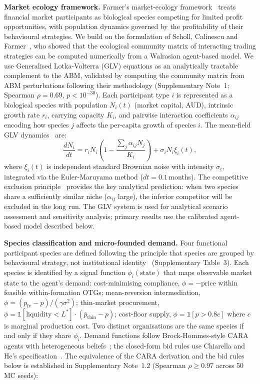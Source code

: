 \documentclass[pdflatex,sn-nature,oneside]{sn-jnl}
\begin{document}
\textbf{Market ecology framework.}
Farmer's market-ecology framework~\cite{Farmer2002} treats financial market
participants as biological species competing for limited profit opportunities,
with population dynamics governed by the profitability of their behavioural
strategies. We build on the formulation of Scholl, Calinescu and
Farmer~\cite{SchollCalinescuFarmer2021}, who showed that the ecological
community matrix of interacting trading strategies can be computed numerically
from a Walrasian agent-based model.
We use Generalised Lotka-Volterra (GLV) equations as an analytically tractable
complement to the ABM, validated by computing the community matrix from ABM
perturbations following their methodology (Supplementary Note~1;
Spearman $\rho = 0.69$, $p < 10^{-30}$).
Each participant type $i$ is represented as a biological species with population
$N_i(t)$ (market capital, AUD), intrinsic growth rate $r_i$, carrying capacity $K_i$,
and pairwise interaction coefficients $\alpha_{ij}$ encoding how species $j$ affects
the per-capita growth of species $i$.
The mean-field GLV dynamics~\cite{Volterra1926} are:
\begin{equation}
  \frac{dN_i}{dt} = r_i N_i \left(1 - \frac{\sum_j \alpha_{ij} N_j}{K_i}\right)
                   + \sigma_i N_i \xi_i(t),
  \label{eq:glv}
\end{equation}
where $\xi_i(t)$ is independent standard Brownian noise with intensity $\sigma_i$,
integrated via the Euler-Maruyama method ($dt = 0.1$\,months).
The competitive exclusion principle~\cite{Hardin1960} provides the key
analytical prediction: when two species share a sufficiently similar niche
($\alpha_{ij}$ large), the inferior competitor will be excluded in the long run.
The GLV system is used for analytical scenario assessment and sensitivity analysis;
primary results use the calibrated agent-based model described below.

\textbf{Species classification and micro-founded demand.}
Four functional participant species are defined following the principle that
species are grouped by behavioural strategy, not institutional
identity~\cite{SchollCalinescuFarmer2021}
(Supplementary Table~3). Each species is identified by a signal function
$\phi_i(\text{state})$ that maps observable market state to the agent's
demand: cost-minimising compliance, $\phi = -\text{price}$ within feasible
within-formation OTGs; mean-reversion intermediation,
$\phi = (p_{\text{fv}} - p)/(\gamma \sigma^2)$;
thin-market procurement, $\phi = \mathbb{1}[\text{liquidity} < L^*]
\cdot (\bar p_{\text{thin}} - p)$;
cost-floor supply, $\phi = \mathbb{1}[p > 0.8 c]$ where $c$ is marginal
production cost. Two distinct organisations are the same species if and
only if they share $\phi_i$.
Demand functions follow Brock-Hommes-style CARA agents with heterogeneous
beliefs~\cite{BrockHommes1997}; the closed-form bid rules use Chiarella and
He's specification~\cite{ChiarellaHe2002}. The equivalence of the CARA
derivation and the bid rules below is established in Supplementary Note~1.2
(Spearman $\rho \geq 0.97$ across 50 MC seeds):
\end{document}
